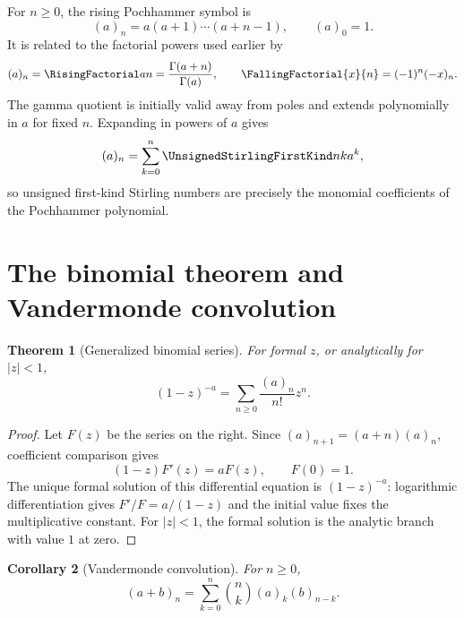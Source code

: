\documentclass[11pt,a4paper,oneside,openany]{book}
\newtheorem{theorem}{Theorem}[chapter]
\newtheorem{corollary}[theorem]{Corollary}
\theoremstyle{definition}
\theoremstyle{remark}
\begin{document}
For $n\ge0$, the rising Pochhammer symbol is
\begin{equation}\label{eq:new-pochhammer-def}
 (a)_n=a(a+1)\cdots(a+n-1),\qquad (a)_0=1.
\end{equation}
It is related to the factorial powers used earlier by
\begin{equation}\label{eq:new-pochhammer-relations}
 (a)_n=\RisingFactorial an=\frac{\Gamma(a+n)}{\Gamma(a)},
 \qquad
 \FallingFactorial{x}{n}=(-1)^n(-x)_n.
\end{equation}
The gamma quotient is initially valid away from poles and extends
polynomially in $a$ for fixed $n$.  Expanding in powers of $a$ gives
\begin{equation}\label{eq:new-pochhammer-stirling}
 (a)_n=\sum_{k=0}^n\UnsignedStirlingFirstKind nk a^k,
\end{equation}
so unsigned first-kind Stirling numbers are precisely the monomial
coefficients of the Pochhammer polynomial.

\section{The binomial theorem and Vandermonde convolution}

\begin{theorem}[Generalized binomial series]\label{thm:new-binomial-series}
For formal $z$, or analytically for $|z|<1$,
\begin{equation}\label{eq:new-binomial-series}
 (1-z)^{-a}=\sum_{n\ge0}\frac{(a)_n}{n!}z^n.
\end{equation}
\end{theorem}

\begin{proof}
Let $F(z)$ be the series on the right.  Since
$(a)_{n+1}=(a+n)(a)_n$, coefficient comparison gives
\[
 (1-z)F'(z)=aF(z),\qquad F(0)=1.
\]
The unique formal solution of this differential equation is
$(1-z)^{-a}$: logarithmic differentiation gives
$F'/F=a/(1-z)$ and the initial value fixes the multiplicative constant.
For $|z|<1$, the formal solution is the analytic branch with value $1$ at
zero.
\end{proof}

\begin{corollary}[Vandermonde convolution]\label{cor:new-vandermonde-pochhammer}
For $n\ge0$,
\begin{equation}\label{eq:new-vandermonde-pochhammer}
 (a+b)_n=\sum_{k=0}^n\binom nk(a)_k(b)_{n-k}.
\end{equation}
\end{corollary}
\end{document}
